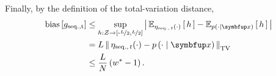 \begin{proofEnd}
  Finally, by the definition of the total-variation distance, 
 \begin{align}
   \mathrm{bias}\left[ g_{\mathrm{seq., t}} \right]
   &\leq \sup_{h : \mathcal{Z} \rightarrow \left[ \text{-}\nicefrac{L}{2}, \nicefrac{L}{2} \right]} \left|\, \Esub{\eta_{\mathrm{seq.},\, t}(\cdot)}{h} - \Esub{p(\cdot\mid\vx)}{h} \,\right| \\
   &= L \, \DTV{ \eta_{\mathrm{seq.},\, t}(\cdot) }{p\left(\cdot\mid\vx\right)}  \\
   &\leq \frac{L}{N} \left( w^* - 1 \right).
 \end{align}
\end{proofEnd}

